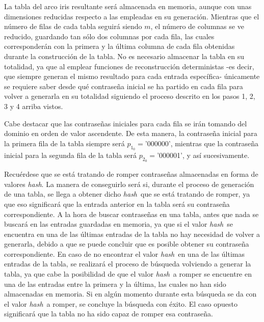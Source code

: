 \documentclass[12pt,spanish,listoffigures,listoftables]{tfgetsinf}
\newcommand{\hash}{\textit{hash}}
\begin{document}
La tabla del arco iris resultante será almacenada en memoria, aunque con unas dimensiones reducidas respecto a las empleadas en su generación. Mientras que el número de filas de cada tabla seguirá siendo $m$, el número de columnas se ve reducido, guardando tan sólo dos columnas por cada fila, las cuales corresponderán con la primera y la última columna de cada fila obtenidas durante la construcción de la tabla. No es necesario almacenar la tabla en su totalidad, ya que al emplear funciones de reconstrucción deterministas -es decir, que siempre generan el mismo resultado para cada entrada específica- únicamente se requiere saber desde qué contraseña inicial se ha partido en cada fila para volver a generarla en su totalidad siguiendo el proceso descrito en los pasos 1, 2, 3 y 4 arriba vistos.

Cabe destacar que las contraseñas iniciales para cada fila se irán tomando del dominio en orden de valor ascendente. De esta manera, la contraseña inicial para la primera fila de la tabla siempre será $p_{1_0} = $'000000', mientras que la contraseña inicial para la segunda fila de la tabla será $p_{2_0} = $'000001', y así sucesivamente.

Recuérdese que se está tratando de romper contraseñas almacenadas en forma de valores \hash. La manera de conseguirlo será si, durante el proceso de generación de una tabla, se llega a obtener dicho \hash~que se está tratando de romper, ya que eso significará que la entrada anterior en la tabla será su contraseña correspondiente. A la hora de buscar contraseñas en una tabla, antes que nada se buscará en las entradas guardadas en memoria, ya que si el valor \hash~se encuentra en una de las últimas entradas de la tabla no hay necesidad de volver a generarla, debido a que se puede concluir que es posible obtener su contraseña correspondiente. En caso de no encontrar el valor \hash~en una de las últimas entradas de la tabla, se realizará el proceso de búsqueda volviendo a generar la tabla, ya que cabe la posibilidad de que el valor \hash~a romper se encuentre en una de las entradas entre la primera y la última, las cuales no han sido almacenadas en memoria. Si en algún momento durante esta búsqueda se da con el valor \hash~a romper, se concluye la búsqueda con éxito. El caso opuesto significará que la tabla no ha sido capaz de romper esa contraseña.
\end{document}
